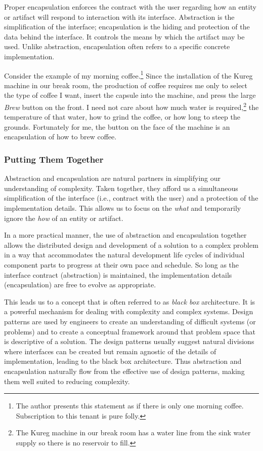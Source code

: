 \documentclass[jou,apacite]{apa6}
\begin{document}
Proper encapsulation enforces the contract with the user regarding how an entity or artifact will respond to interaction with its interface.  Abstraction is the simplification of the interface; encapsulation is the hiding and protection of the data behind the interface.  It controls the means by which the artifact may be used.  Unlike abstraction, encapsulation often refers to a specific concrete implementation.

Consider the example of my morning coffee.\footnote{The author presents this statement as if there is only one morning coffee.  Subscription to this tenant is pure folly.}  Since the installation of the Kureg machine in our break room, the production of coffee requires me only to select the type of coffee I want, insert the capsule into the machine, and press the large \emph{Brew} button on the front.  I need not care about how much water is required,\footnote{The Kureg machine in our break room has a water line from the sink water supply so there is no reservoir to fill.} the temperature of that water, how to grind the coffee, or how long to steep the grounds.  Fortunately for me, the button on the face of the machine is an encapsulation of how to brew coffee.

\subsubsection{Putting Them Together}
Abstraction and encapsulation are natural partners in simplifying our understanding of complexity.  Taken together, they afford us a simultaneous simplification of the interface (i.e., contract with the user) and a protection of the implementation details.  This allows us to focus on the \emph{what} and temporarily ignore the \emph{how} of an entity or artifact.

In a more practical manner, the use of abstraction and encapsulation together allows the distributed design and development of a solution to a complex problem in a way that accommodates the natural development life cycles of individual component parts to progress at their own pace and schedule.  So long as the interface contract (abstraction) is maintained, the implementation details (encapsulation) are free to evolve as appropriate.

This leads us to a concept that is often referred to as \emph{black box} architecture.  It is a powerful mechanism for dealing with complexity and complex systems.  Design patterns are used by engineers to create an understanding of difficult systems (or problems) and to create a conceptual framework around that problem space that is descriptive of a solution.  The design patterns usually suggest natural divisions where interfaces can be created but remain agnostic of the details of implementation, leading to the black box architecture.  Thus abstraction and encapsulation naturally flow from the effective use of design patterns, making them well suited to reducing complexity.
\end{document}
